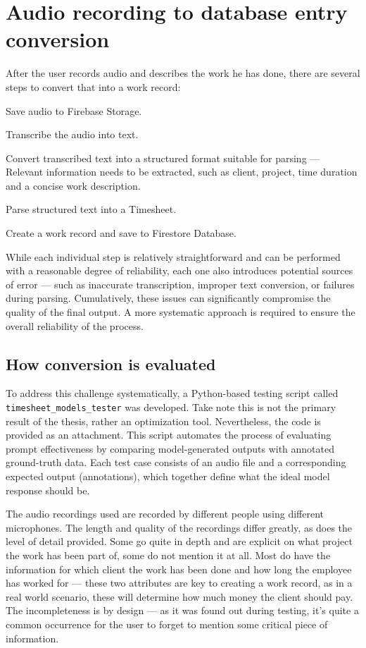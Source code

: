\documentclass[
  digital,     %
  oneside,     %
  nosansbold,  %
  nocolorbold, %
  lof,         %
  lot,         %
]{fithesis4}
\begin{document}
\section{Audio recording to database entry conversion}

After the user records audio and describes the work he has done, there are several steps to convert that into a work record:
\begin{compactenum}
  \item Save audio to Firebase Storage.
  \item Transcribe the audio into text.
  \item Convert transcribed text into a structured format suitable for parsing --- Relevant information needs to be extracted, such as client, project, time duration and a concise work description.
  \item Parse structured text into a Timesheet.
  \item Create a work record and save to Firestore Database.
\end{compactenum}

\vspace{\baselineskip}

While each individual step is relatively straightforward and can be performed with a reasonable degree of reliability, each one also introduces potential sources of error --- such as inaccurate transcription, improper text conversion, or failures during parsing. Cumulatively, these issues can significantly compromise the quality of the final output. A more systematic approach is required to ensure the overall reliability of the process.

\subsection{How conversion is evaluated}
To address this challenge systematically, a Python-based testing script called \texttt{timesheet\_models\_tester} was developed. Take note this is not the primary result of the thesis, rather an optimization tool. Nevertheless, the code is provided as an attachment. This script automates the process of evaluating prompt effectiveness by comparing model-generated outputs with annotated ground-truth data. Each test case consists of an audio file and a corresponding expected output (annotations), which together define what the ideal model response should be.

The audio recordings used are recorded by different people using different microphones. The length and quality of the recordings differ greatly, as does the level of detail provided. Some go quite in depth and are explicit on what project the work has been part of, some do not mention it at all. Most do have the information for which client the work has been done and how long the employee has worked for --- these two attributes are key to creating a work record, as in a real world scenario, these will determine how much money the client should pay. The incompleteness is by design --- as it was found out during testing, it's quite a common occurrence for the user to forget to mention some critical piece of information.
\end{document}
